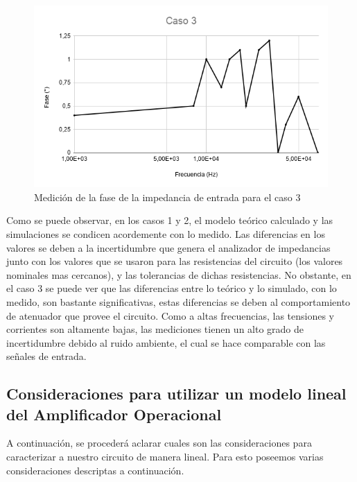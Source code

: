 \begin{figure}[H]
\begin{centering}
\includegraphics[scale=0.5]{../Ex1/iA/Resources1a/zinpp3_med}
\par\end{centering}
\caption{Medición de la fase de la impedancia de entrada para el caso 3}

\end{figure}

Como se puede observar, en los casos 1 y 2, el modelo teórico calculado
y las simulaciones se condicen acordemente con lo medido. Las diferencias
en los valores se deben a la incertidumbre que genera el analizador
de impedancias junto con los valores que se usaron para las resistencias
del circuito (los valores nominales mas cercanos), y las tolerancias
de dichas resistencias. No obstante, en el caso 3 se puede ver que
las diferencias entre lo teórico y lo simulado, con lo medido, son
bastante significativas, estas diferencias se deben al comportamiento
de atenuador que provee el circuito. Como a altas frecuencias, las
tensiones y corrientes son altamente bajas, las mediciones tienen
un alto grado de incertidumbre debido al ruido ambiente, el cual se
hace comparable con las señales de entrada.

\subsection{Consideraciones para utilizar un modelo lineal del Amplificador Operacional}

A continuación, se procederá aclarar cuales son las consideraciones
para caracterizar a nuestro circuito de manera lineal. Para esto poseemos
varias consideraciones descriptas a continuación.

